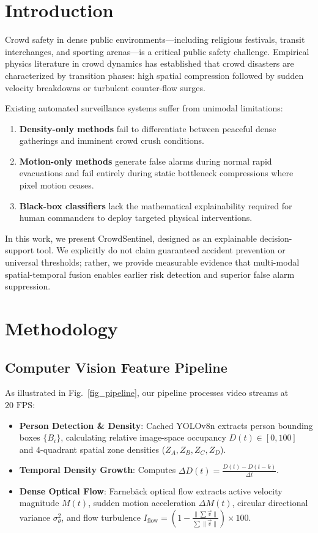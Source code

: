 \documentclass[conference]{IEEEtran}
\begin{document}
\section{Introduction}
Crowd safety in dense public environments—including religious festivals, transit interchanges, and sporting arenas—is a critical public safety challenge. Empirical physics literature in crowd dynamics has established that crowd disasters are characterized by transition phases: high spatial compression followed by sudden velocity breakdowns or turbulent counter-flow surges.

Existing automated surveillance systems suffer from unimodal limitations:
\begin{enumerate}
    \item \textbf{Density-only methods} fail to differentiate between peaceful dense gatherings and imminent crowd crush conditions.
    \item \textbf{Motion-only methods} generate false alarms during normal rapid evacuations and fail entirely during static bottleneck compressions where pixel motion ceases.
    \item \textbf{Black-box classifiers} lack the mathematical explainability required for human commanders to deploy targeted physical interventions.
\end{enumerate}

In this work, we present CrowdSentinel, designed as an explainable decision-support tool. We explicitly do not claim guaranteed accident prevention or universal thresholds; rather, we provide measurable evidence that multi-modal spatial-temporal fusion enables earlier risk detection and superior false alarm suppression.

\section{Methodology}
\subsection{Computer Vision Feature Pipeline}
As illustrated in Fig.~\ref{fig_pipeline}, our pipeline processes video streams at $20\text{ FPS}$:
\begin{itemize}
    \item \textbf{Person Detection \& Density}: Cached YOLOv8n extracts person bounding boxes $\{B_i\}$, calculating relative image-space occupancy $D(t) \in [0, 100]$ and 4-quadrant spatial zone densities ($Z_A, Z_B, Z_C, Z_D$).
    \item \textbf{Temporal Density Growth}: Computes $\Delta D(t) = \frac{D(t) - D(t-k)}{\Delta t}$.
    \item \textbf{Dense Optical Flow}: Farneb\"ack optical flow extracts active velocity magnitude $M(t)$, sudden motion acceleration $\Delta M(t)$, circular directional variance $\sigma^2_\theta$, and flow turbulence $I_{\text{flow}} = (1 - \frac{\|\sum \vec{v}\|}{\sum \|\vec{v}\|}) \times 100$.
\end{itemize}
\end{document}
